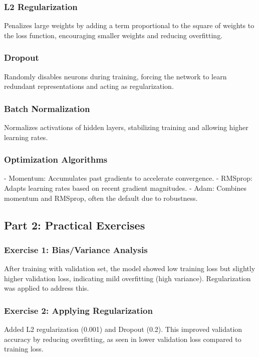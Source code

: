 \documentclass{article}
\begin{document}
\subsubsection{L2 Regularization}
Penalizes large weights by adding a term proportional to the square of weights to the loss function, encouraging smaller weights and reducing overfitting.

\subsubsection{Dropout}
Randomly disables neurons during training, forcing the network to learn redundant representations and acting as regularization.

\subsubsection{Batch Normalization}
Normalizes activations of hidden layers, stabilizing training and allowing higher learning rates.

\subsubsection{Optimization Algorithms}
- Momentum: Accumulates past gradients to accelerate convergence.
- RMSprop: Adapts learning rates based on recent gradient magnitudes.
- Adam: Combines momentum and RMSprop, often the default due to robustness.

\subsection{Part 2: Practical Exercises}

\subsubsection{Exercise 1: Bias/Variance Analysis}
After training with validation set, the model showed low training loss but slightly higher validation loss, indicating mild overfitting (high variance). Regularization was applied to address this.

\subsubsection{Exercise 2: Applying Regularization}
Added L2 regularization (0.001) and Dropout (0.2). This improved validation accuracy by reducing overfitting, as seen in lower validation loss compared to training loss.
\end{document}
